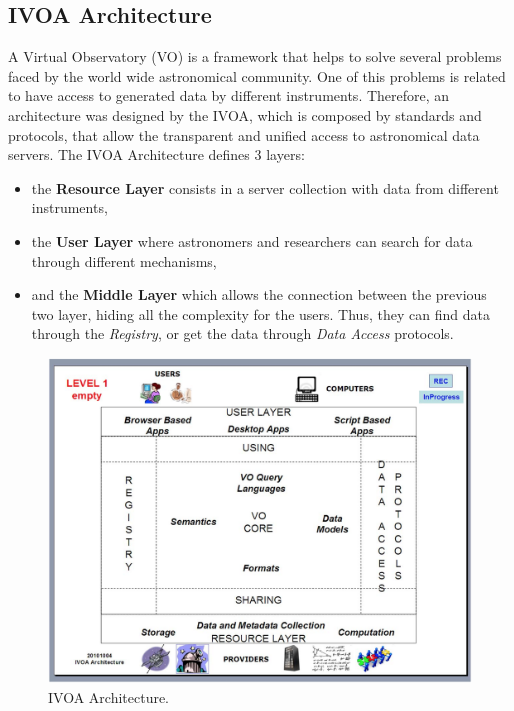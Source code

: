 \subsection{IVOA Architecture}

A Virtual Observatory (VO) is a framework that helps to solve several
problems faced by the world wide astronomical community.
One of this problems is related to have access to generated data by
different instruments. Therefore, an architecture
\cite{ivoaarchitecture} was designed by the IVOA, which is composed by
standards and protocols, that allow the transparent
and unified access to astronomical data servers. The IVOA Architecture
defines 3 layers:
\begin{itemize}
        \item the \textbf{Resource Layer} consists in a server
collection with data from different instruments,
        \item the \textbf{User Layer} where astronomers and researchers can
search for data through different mechanisms,
        \item and the \textbf{Middle Layer} which allows the connection
between the previous two layer, hiding all the complexity for the
users. Thus, they can find data through the \emph{Registry}, or get the data
through \emph{Data Access} protocols.
\end{itemize}

\begin{figure}%
\begin{center}
	\includegraphics[width=0.9\linewidth]{img/ivoa_arch.png}
	\caption{IVOA Architecture.}
\end{center}
\label{figure:ivoarch}
\end{figure}

